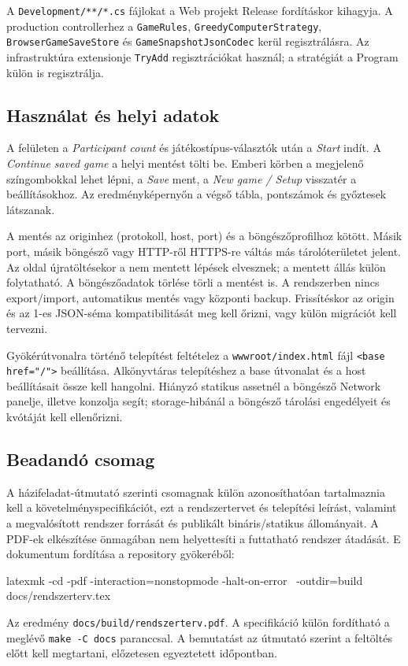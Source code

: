 \documentclass[11pt,a4paper]{article}
\newcommand{\code}[1]{\nolinkurl{#1}}
\begin{document}
A \code{Development/**/*.cs} fájlokat a Web projekt Release fordításkor kihagyja. A production controllerhez a \code{GameRules}, \code{GreedyComputerStrategy}, \code{BrowserGameSaveStore} és \code{GameSnapshotJsonCodec} kerül regisztrálásra. Az infrastruktúra extensionje \code{TryAdd} regisztrációkat használ; a stratégiát a Program külön is regisztrálja.

\subsection{Használat és helyi adatok}
A felületen a \emph{Participant count} és játékostípus-választók után a \emph{Start} indít. A \emph{Continue saved game} a helyi mentést tölti be. Emberi körben a megjelenő színgombokkal lehet lépni, a \emph{Save} ment, a \emph{New game / Setup} visszatér a beállításokhoz. Az eredményképernyőn a végső tábla, pontszámok és győztesek látszanak.

A mentés az originhez (protokoll, host, port) és a böngészőprofilhoz kötött. Másik port, másik böngésző vagy HTTP-ről HTTPS-re váltás más tárolóterületet jelent. Az oldal újratöltésekor a nem mentett lépések elvesznek; a mentett állás külön folytatható. A böngészőadatok törlése törli a mentést is. A rendszerben nincs export/import, automatikus mentés vagy központi backup. Frissítéskor az origin és az 1-es JSON-séma kompatibilitását meg kell őrizni, vagy külön migrációt kell tervezni.

Gyökérútvonalra történő telepítést feltételez a \code{wwwroot/index.html} fájl \code{<base href="/">} beállítása. Alkönyvtáras telepítéshez a base útvonalat és a host beállításait össze kell hangolni. Hiányzó statikus assetnél a böngésző Network panelje, illetve konzolja segít; storage-hibánál a böngésző tárolási engedélyeit és kvótáját kell ellenőrizni.

\subsection{Beadandó csomag}
A házifeladat-útmutató szerinti csomagnak külön azonosíthatóan tartalmaznia kell a követelményspecifikációt, ezt a rendszertervet és telepítési leírást, valamint a megvalósított rendszer forrását és publikált bináris/statikus állományait. A PDF-ek elkészítése önmagában nem helyettesíti a futtatható rendszer átadását. E dokumentum fordítása a repository gyökeréből:
\begin{commands}
latexmk -cd -pdf -interaction=nonstopmode -halt-on-error \
  -outdir=build docs/rendszerterv.tex
\end{commands}
Az eredmény \code{docs/build/rendszerterv.pdf}. A specifikáció külön fordítható a meglévő \code{make -C docs} paranccsal. A bemutatást az útmutató szerint a feltöltés előtt kell megtartani, előzetesen egyeztetett időpontban.
\end{document}
